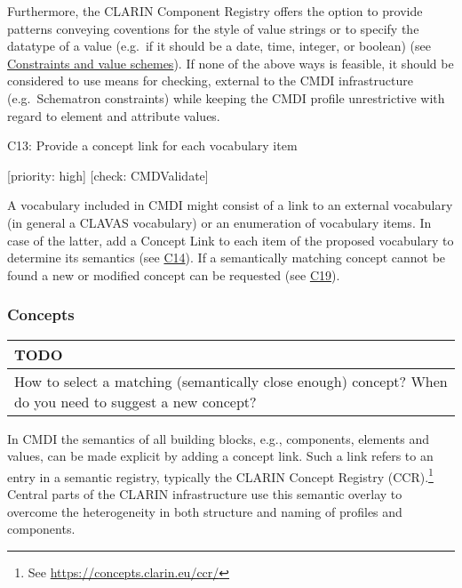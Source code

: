 \documentclass[]{article}
\begin{document}
Furthermore, the CLARIN Component Registry offers the option to provide
patterns conveying coventions for the style of value strings or to
specify the datatype of a value (e.g.~if it should be a date, time,
integer, or boolean) (see
\protect\hyperlink{constraints-and-value-schemes}{Constraints and value
schemes}). If none of the above ways is feasible, it should be
considered to use means for checking, external to the CMDI
infrastructure (e.g.~Schematron constraints) while keeping the CMDI
profile unrestrictive with regard to element and attribute values.

C13: Provide a concept link for each vocabulary item

{[}priority: high{]} {[}check: CMDValidate{]}

A vocabulary included in CMDI might consist of a link to an external
vocabulary (in general a CLAVAS vocabulary) or an enumeration of
vocabulary items. In case of the latter, add a Concept Link to each item
of the proposed vocabulary to determine its semantics (see
\protect\hyperlink{c14}{C14}). If a semantically matching concept cannot
be found a new or modified concept can be requested (see
\protect\hyperlink{c19}{C19}).

\hypertarget{concepts}{\subsubsection{Concepts}\label{concepts}}

\begin{longtable}[c]{@{}l@{}}
\toprule
\begin{minipage}[b]{0.05\columnwidth}\raggedright\strut
TODO
\strut\end{minipage}\tabularnewline
\midrule
\endhead
\begin{minipage}[t]{0.05\columnwidth}\raggedright\strut
How to select a matching (semantically close enough) concept? When do
you need to suggest a new concept?
\strut\end{minipage}\tabularnewline
\bottomrule
\end{longtable}

In CMDI the semantics of all building blocks, e.g., components, elements
and values, can be made explicit by adding a concept link. Such a link
refers to an entry in a semantic registry, typically the CLARIN Concept
Registry (CCR).\footnote{See \url{https://concepts.clarin.eu/ccr/}}
Central parts of the CLARIN infrastructure use this semantic overlay to
overcome the heterogeneity in both structure and naming of profiles and
components.
\end{document}
